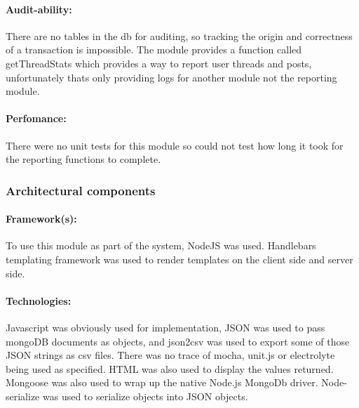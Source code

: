 \paragraph {Audit-ability:}
There are no tables in the db for auditing, so tracking the origin and correctness of a transaction is impossible. The module provides a function called getThreadStats which provides a way to report user threads and posts, unfortunately thats only providing logs for another module not the reporting module. 
\par
\paragraph{Perfomance:}
There were no unit tests for this module so could not test how long it took for the reporting functions to complete. 
\par


\subsubsection{Architectural components}
\paragraph {Framework(s):}
 To use this module as part of the system, NodeJS was used.
 Handlebars templating framework was used to render templates on the client side and server side.
\par
\paragraph{Technologies:}
 Javascript was obviously used for implementation, JSON was used to pass mongoDB documents as objects, and json2csv was used to export some of those JSON strings as csv files. There was no trace of mocha, unit.js or electrolyte being used as specified. HTML was also used to display the values returned. Mongoose was also used to wrap up the native Node.js MongoDb driver. Node-serialize was used to serialize objects into JSON objects.
\par

